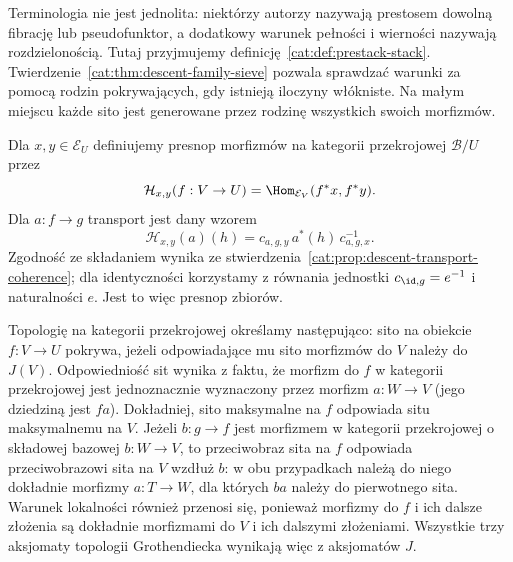 Terminologia nie jest jednolita: niektórzy autorzy nazywają prestosem dowolną fibrację lub pseudofunktor, a dodatkowy warunek pełności i wierności nazywają rozdzielonością. Tutaj przyjmujemy definicję~\ref{cat:def:prestack-stack}. Twierdzenie~\ref{cat:thm:descent-family-sieve} pozwala sprawdzać warunki za pomocą rodzin pokrywających, gdy istnieją iloczyny włókniste. Na małym miejscu każde sito jest generowane przez rodzinę wszystkich swoich morfizmów.

Dla $x,y\in\mathcal E_U$ definiujemy presnop morfizmów na kategorii przekrojowej $\mathcal B/U$ przez
\[
 \mathcal H_{x,y}(f:V\to U)
 =\Hom_{\mathcal E_V}(f^*x,f^*y).
\]
Dla $a:f\to g$ transport jest dany wzorem
\[
 \mathcal H_{x,y}(a)(h)
 =c_{a,g,y}\,a^*(h)\,c_{a,g,x}^{-1}.
\]
Zgodność ze składaniem wynika ze stwierdzenia~\ref{cat:prop:descent-transport-coherence}; dla identyczności korzystamy z równania jednostki $c_{\id,g}=e^{-1}$ i naturalności $e$. Jest to więc presnop zbiorów.

Topologię na kategorii przekrojowej określamy następująco: sito na obiekcie $f:V\to U$ pokrywa, jeżeli odpowiadające mu sito morfizmów do $V$ należy do $J(V)$. Odpowiedniość sit wynika z faktu, że morfizm do $f$ w kategorii przekrojowej jest jednoznacznie wyznaczony przez morfizm $a:W\to V$ (jego dziedziną jest $fa$). Dokładniej, sito maksymalne na $f$ odpowiada situ maksymalnemu na $V$. Jeżeli $b:g\to f$ jest morfizmem w kategorii przekrojowej o składowej bazowej $b:W\to V$, to przeciwobraz sita na $f$ odpowiada przeciwobrazowi sita na $V$ wzdłuż $b$: w obu przypadkach należą do niego dokładnie morfizmy $a:T\to W$, dla których $ba$ należy do pierwotnego sita. Warunek lokalności również przenosi się, ponieważ morfizmy do $f$ i ich dalsze złożenia są dokładnie morfizmami do $V$ i ich dalszymi złożeniami. Wszystkie trzy aksjomaty topologii Grothendiecka wynikają więc z aksjomatów $J$.

